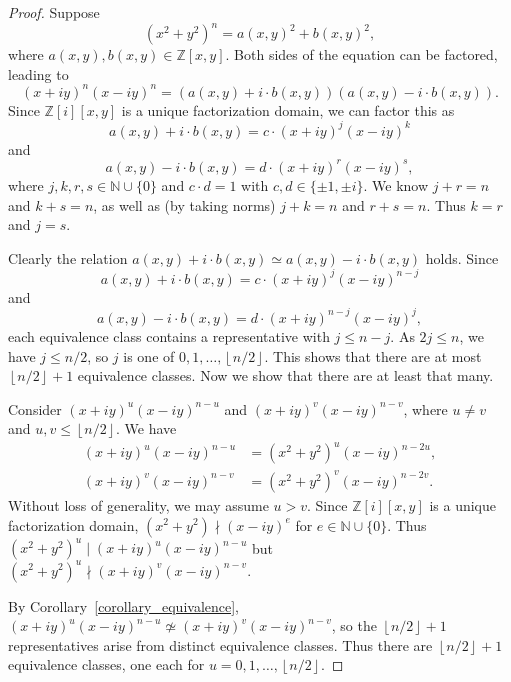 \documentclass[12pt,table]{article}
\theoremstyle{definition}
\theoremstyle{remark}
\newcommand{\Nnn}{\mathbb N}
\newcommand{\Zzz}{\mathbb Z}
\newcommand{\divides}{\mid}
\newcommand{\notdivides}{\nmid}
\newcommand{\myfrac}[2]{#1 / #2}
\numberwithin{equation}{section}
\begin{document}
\begin{proof}
Suppose 
\[
(x^2 + y^2)^n = a(x,y)^2 + b(x,y)^2,
\]
where $ a(x,y), b(x,y) \in \Zzz[x,y] $.
Both sides of the equation can be factored, leading to  
\[
(x + iy)^n (x -  iy)^n = ( a(x,y) + i \cdot b(x,y) ) ( a(x,y) - i \cdot b(x,y) ) .
\]
Since $ \Zzz [i][x,y] $ is a unique factorization domain,
we can factor this as
\[
a(x,y) + i \cdot b(x,y) = c \cdot (x + iy)^j (x -  iy)^k
\]
and
\[
a(x,y) - i \cdot b(x,y) = d \cdot (x + iy)^r (x -  iy)^s,
\]
where $ j, k, r, s \in \Nnn \cup \{0\} $ and
$c \cdot d = 1 $ with $ c,d \in \{ \pm 1 , \pm i \} $. 
We know $ j + r = n $ and $ k + s = n $, as well as
(by taking norms) $ j + k = n $ and $ r + s = n $.
Thus $k = r$ and $j = s$.

Clearly the relation
$ a(x,y) + i \cdot b(x,y) \simeq  a(x,y) - i \cdot b(x,y) $
holds.
Since 
\[ 
a(x,y) + i \cdot b(x,y) = c \cdot (x + iy)^j (x -  iy)^{n-j} 
\]
and 
\[ 
a(x,y) - i \cdot b(x,y) = d \cdot (x + iy)^{n-j} (x -  iy)^j,
\]
each equivalence class contains a representative with $ j \leq n - j
$.  As $ 2j \leq n $, we have $ j \leq \myfrac{n}{2} $, so $ j $
is one of $ 0, 1, \dotsc, \left\lfloor \myfrac{n}{2} \right\rfloor $. This shows
that there are at most $ \left\lfloor \myfrac{n}{2} \right\rfloor + 1 $
equivalence classes. Now we show that there are at least that many.



Consider $ (x + iy)^u (x -  iy)^{n-u} $  and $ (x + iy)^v (x -  iy)^{n-v} $,
where $ u \neq v $ and $u,v \leq \left \lfloor \myfrac{n}{2} \right \rfloor $. We have
\begin{align*}
(x + iy)^u (x -  iy)^{n-u} &= (x^2 + y^2)^u (x -  iy)^{n-2u},
\\
(x + iy)^v (x -  iy)^{n-v} &= (x^2 + y^2)^v (x -  iy)^{n-2v}.
\end{align*}
Without loss of generality, we may assume $ u > v $. 
Since $ \Zzz [i][x,y] $ is a unique factorization domain,
$ (x^2 + y^2) \notdivides (x -  iy)^e $ for $ e \in \Nnn \cup \{ 0 \} $.
Thus $ (x^2 + y^2)^u \divides (x + iy)^u (x -  iy)^{n-u} $
but $ (x^2 + y^2)^u \notdivides (x + iy)^v (x -  iy)^{n-v} $.

By Corollary~\ref{corollary_equivalence},
$ (x + iy)^u (x -  iy)^{n-u} \not\simeq (x + iy)^v (x -  iy)^{n-v} $, 
so the $ \left\lfloor \myfrac{n}{2} \right\rfloor + 1 $ representatives arise from
distinct equivalence classes.
Thus there are $ \left\lfloor \myfrac{n}{2} \right\rfloor + 1 $ equivalence classes, 
one each for $ u = 0, 1, \dotsc,  \left\lfloor \myfrac{n}{2} \right\rfloor $.
\end{proof}
\end{document}
